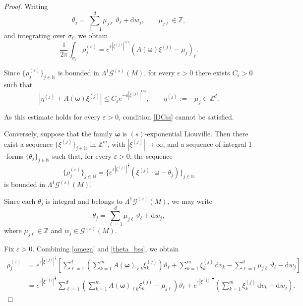 \documentclass[10pt,a4paper]{amsart}
\begin{document}
\begin{proof}
	Writing
	\[
	\theta_j = \sum_{\ell=1}^d \mu_{j\ell}\,\vartheta_\ell + \mathrm{d}w_j,
	\qquad \mu_{j\ell}\in\mathbb{Z},
	\]
	and integrating over $\sigma_\ell$, we obtain
	\[
	\frac{1}{2\pi} \int_{\sigma_\ell} \rho_j^{(\varepsilon)} 
	= e^{\varepsilon|\xi^{(j)}|^{1/s}} \left( A(\boldsymbol{\omega})\xi^{(j)} - \mu_j \right)_\ell.
	\]
	
	Since $\{\rho_j^{(\varepsilon)}\}_{j\in\mathbb{N}}$ is bounded in $\mathsf{\Lambda}^1 \mathscr{G}^{(s)}(M)$, for every $\varepsilon>0$ there exists $C_\varepsilon>0$ such that
	\[
	|\eta^{(j)} + A(\boldsymbol{\omega})\xi^{(j)}| 	\le C_\varepsilon e^{-\varepsilon|\xi^{(j)}|^{1/s}},
	\qquad \eta^{(j)}:=-\mu_j\in\mathbb{Z}^d.
	\]
	
	As this estimate holds for every $\varepsilon>0$,  condition \eqref{DCss} cannot be satisfied. 
	
	Conversely, suppose that the family $\boldsymbol{\omega}$ is $(s)$-exponential Liouville. 	Then there exist a sequence $\{\xi^{(j)}\}_{j\in\mathbb{N}}$ in $\mathbb{Z}^m$, with $|\xi^{(j)}|\to\infty$, and a sequence of integral $1$-forms $\{\theta_j\}_{j\in\mathbb{N}}$ such that, 
	for every $\varepsilon>0$, the sequence
	\[
	\{\rho_j^{(\varepsilon)}\}_{j\in\mathbb{N}} = \big\{e^{\varepsilon|\xi^{(j)}|^{\frac{1}{s}}} 	(\xi^{(j)} \cdot \boldsymbol{\omega} - \theta_j)\big\}_{j\in\mathbb{N}}
	\]
	is bounded in $\mathsf{\Lambda}^1 \mathscr{G}^{(s)}(M)$.
	
	Since each $\theta_j$ is integral and belongs to 
	$\mathsf{\Lambda}^1\mathscr{G}^{(s)}(M)$, 
	we may write
	\begin{equation}\label{theta_bss}
		\theta_j = \sum_{\ell=1}^{d} \mu_{j\ell}\,\vartheta_\ell + \mathrm{d}w_j,
	\end{equation}
	where $\mu_{j\ell}\in\mathbb{Z}$ and $w_j\in\mathscr{G}^{(s)}(M)$.
	
	Fix $\varepsilon>0$. 
	Combining \eqref{omega} and \eqref{theta_bss}, we obtain
	\begin{align*}
		\rho_j^{(\varepsilon)}
		&= e^{\varepsilon|\xi^{(j)}|^{\frac{1}{s}}} \left[ 	\sum_{\ell=1}^{d} \left( \sum_{k=1}^{m} A(\boldsymbol{\omega})_{\ell k}\xi^{(j)}_k \right)\vartheta_\ell
		+ \sum_{k=1}^{m}\xi^{(j)}_k\,\mathrm{d}v_k 	- \sum_{\ell=1}^{d} \mu_{j\ell}\,\vartheta_\ell - \mathrm{d}w_j
		\right] \\ 
		&= e^{\varepsilon|\xi^{(j)}|^{\frac{1}{s}}} \sum_{\ell=1}^{d} \left( \sum_{k=1}^{m}
		A(\boldsymbol{\omega})_{\ell k}\xi^{(j)}_k - \mu_{j\ell} 	\right)\vartheta_\ell
		+ e^{\varepsilon|\xi^{(j)}|^{\frac{1}{s}}} 	\left( 	\sum_{k=1}^{m} \xi^{(j)}_k\,\mathrm{d}v_k - \mathrm{d}w_j \right).
	\end{align*}
	

\end{proof}
\end{document}
